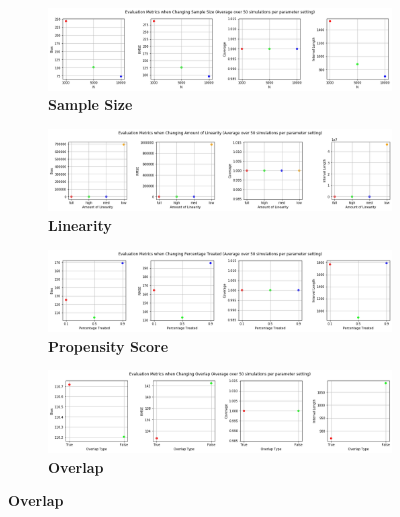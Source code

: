 \documentclass[12pt]{article}
\begin{document}
\begin{figure}[h]
\caption{Model Performance by Parameter Variation }
	\centering
	\begin{subfigure} [h] {\linewidth}
		\caption{\textbf{Sample Size}}
   	 	\includegraphics[width = \linewidth]{Graphs/s2_nsiz.png}
	\end{subfigure}
	\begin{subfigure} [h] {\linewidth}
\vspace{0.5cm}
		\caption{\textbf{Linearity}}
   	 	\includegraphics[width = \linewidth]{Graphs/s2_linear.png}
	\end{subfigure}
	\begin{subfigure} [h] {\linewidth}
\vspace{0.5cm}
		\caption{\textbf{Propensity Score}}
   	 	\includegraphics[width = \linewidth]{Graphs/s2_propen.png}
	\end{subfigure}
	\begin{subfigure} [h] {\linewidth}
\vspace{0.5cm}
		\caption{\textbf{Overlap}}
   	 	\includegraphics[width = \linewidth]{Graphs/s2_overlap.png}
	\end{subfigure}
\end{figure} 
\end{document}
